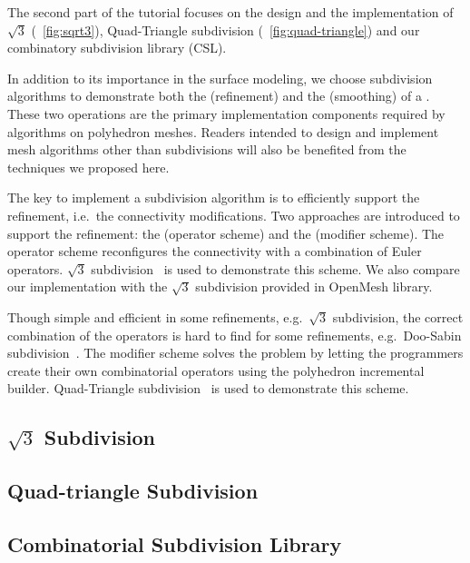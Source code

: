 The second part of the tutorial focuses on the design and the
implementation of $\sqrt{3}$ (\figurename\ \ref{fig:sqrt3}),
Quad-Triangle subdivision (\figurename\ \ref{fig:quad-triangle})
and our combinatory subdivision library (CSL).

In addition to its importance in the surface modeling, we choose
subdivision algorithms to demonstrate both the
 (refinement) and the
 (smoothing) of a
\cgalpoly . These two operations are the
primary implementation components required by algorithms on polyhedron
meshes. Readers intended to design and implement mesh algorithms other
than subdivisions will also be benefited from the techniques we
proposed here.

The key to implement a subdivision algorithm is to efficiently support
the refinement, i.e.\ the connectivity modifications. Two approaches
are introduced to support the refinement: the 
(operator scheme) and the 
(modifier scheme).  The operator scheme reconfigures the connectivity
with a combination of Euler operators. $\sqrt{3}$
subdivision~\cite{sqrt3} is used to demonstrate this scheme. We also
compare our implementation with the $\sqrt{3}$ subdivision provided in
OpenMesh library.

Though simple and efficient in some refinements, e.g.\ $\sqrt{3}$
subdivision, the correct combination of the operators is hard to find
for some refinements, e.g.\ Doo-Sabin subdivision~\cite{ds}. The
modifier scheme solves the problem by letting the programmers create
their own combinatorial operators using the polyhedron incremental
builder. Quad-Triangle subdivision~\cite{qts,l-pg-03} is used to
demonstrate this scheme.

\subsection{$\sqrt{3}$ Subdivision}


\subsection{Quad-triangle Subdivision}


\subsection{Combinatorial Subdivision Library}


